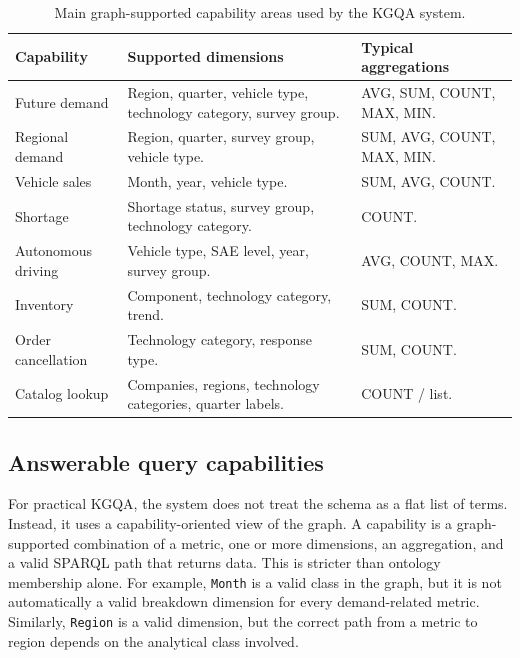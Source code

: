 \documentclass[
  12pt,
  english,
  oneside]{report}
\begin{document}
\begin{table}[htbp]
\centering
\caption{Main graph-supported capability areas used by the KGQA system.}
\label{tab:domain-capabilities}
\small
\begin{tabularx}{\textwidth}{
>{\raggedright\arraybackslash}p{3.2cm}
>{\raggedright\arraybackslash}X
>{\raggedright\arraybackslash}p{3.2cm}
}
\toprule
\textbf{Capability} & \textbf{Supported dimensions} & \textbf{Typical aggregations} \\
\midrule
Future demand & Region, quarter, vehicle type, technology category, survey group. & AVG, SUM, COUNT, MAX, MIN. \\
Regional demand & Region, quarter, survey group, vehicle type. & SUM, AVG, COUNT, MAX, MIN. \\
Vehicle sales & Month, year, vehicle type. & SUM, AVG, COUNT. \\
Shortage & Shortage status, survey group, technology category. & COUNT. \\
Autonomous driving & Vehicle type, SAE level, year, survey group. & AVG, COUNT, MAX. \\
Inventory & Component, technology category, trend. & SUM, COUNT. \\
Order cancellation & Technology category, response type. & SUM, COUNT. \\
Catalog lookup & Companies, regions, technology categories, quarter labels. & COUNT / list. \\
\bottomrule
\end{tabularx}
\end{table}

\subsection{Answerable query capabilities}
\label{subsec:answerable-query-capabilities}

For practical KGQA, the system does not treat the schema as a flat list of terms. Instead, it uses a capability-oriented view of the graph. A capability is a graph-supported combination of a metric, one or more dimensions, an aggregation, and a valid SPARQL path that returns data. This is stricter than ontology membership alone. For example, \texttt{Month} is a valid class in the graph, but it is not automatically a valid breakdown dimension for every demand-related metric. Similarly, \texttt{Region} is a valid dimension, but the correct path from a metric to region depends on the analytical class involved.
\end{document}
